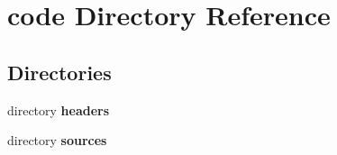 \section{code Directory Reference}
\label{dir_050edd66366d13764f98250ef6db77f6}
\subsection*{Directories}
\begin{DoxyCompactItemize}
\item 
directory \textbf{ headers}
\item 
directory \textbf{ sources}
\end{DoxyCompactItemize}
